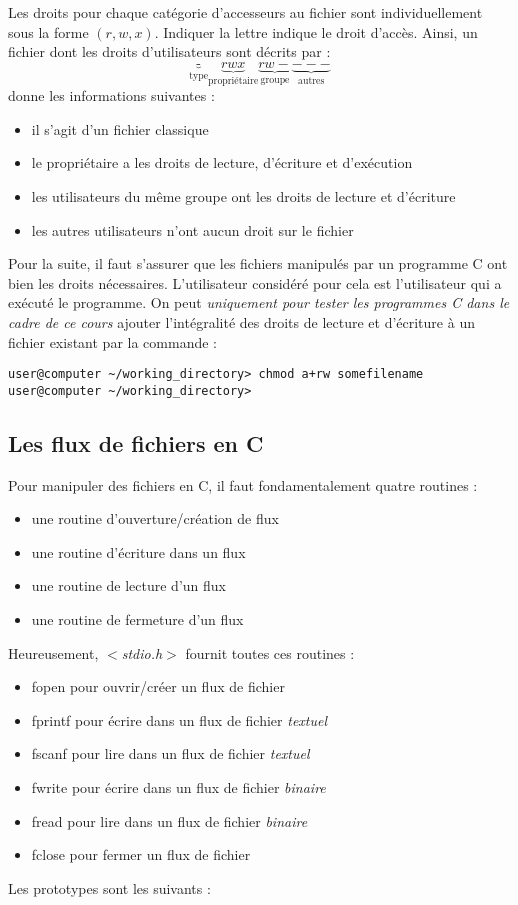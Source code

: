 \documentclass[../../../main.tex]{subfiles}
\begin{document}
Les droits pour chaque catégorie d'accesseurs au fichier sont individuellement sous la forme $(r, w, x)$. Indiquer la lettre indique le droit d'accès. Ainsi, un fichier dont les droits d'utilisateurs sont décrits par :
$$\underbrace{\text{-}}_{\text{type}}\underbrace{rwx}_{\text{propriétaire}}\underbrace{rw-}_{\text{groupe}}\underbrace{---}_{\text{autres}}$$
donne les informations suivantes :
\begin{itemize}
	\item il s'agit d'un fichier classique
	\item le propriétaire a les droits de lecture, d'écriture et d'exécution
	\item les utilisateurs du même groupe ont les droits de lecture et d'écriture
	\item les autres utilisateurs n'ont aucun droit sur le fichier
\end{itemize}
Pour la suite, il faut s'assurer que les fichiers manipulés par un programme C ont bien les droits nécessaires. L'utilisateur considéré pour cela est l'utilisateur qui a exécuté le programme. On peut \textit{uniquement pour tester les programmes C dans le cadre de ce cours} ajouter l'intégralité des droits de lecture et d'écriture à un fichier existant par la commande :
\begin{verbatim}
user@computer ~/working_directory> chmod a+rw somefilename
user@computer ~/working_directory>
\end{verbatim}
\subsection{Les flux de fichiers en C}
\label{sub:les_flux_de_fichiers_en_c}
Pour manipuler des fichiers en C, il faut fondamentalement quatre routines :
\begin{itemize}
	\item une routine d'ouverture/création de flux
	\item une routine d'écriture dans un flux
	\item une routine de lecture d'un flux
	\item une routine de fermeture d'un flux
\end{itemize}
Heureusement, \textit{$<$stdio.h$>$} fournit toutes ces routines :
\begin{itemize}
	\item \textsf{fopen} pour ouvrir/créer un flux de fichier
	\item \textsf{fprintf} pour écrire dans un flux de fichier \textit{textuel}
	\item \textsf{fscanf} pour lire dans un flux de fichier \textit{textuel}
	\item \textsf{fwrite} pour écrire dans un flux de fichier \textit{binaire}
	\item \textsf{fread} pour lire dans un flux de fichier \textit{binaire}
	\item \textsf{fclose} pour fermer un flux de fichier
\end{itemize}
Les prototypes sont les suivants :
\end{document}
